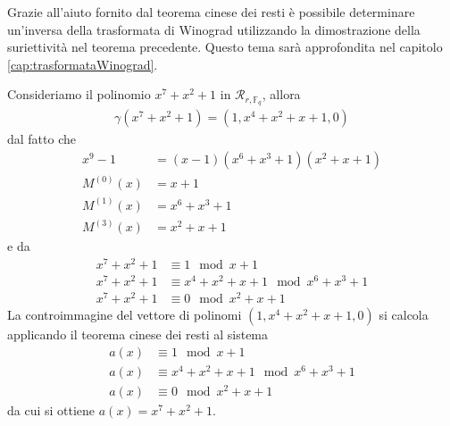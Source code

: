 \begin{osservazione}
   Grazie all'aiuto fornito dal teorema cinese dei resti è possibile determinare un'inversa della trasformata di Winograd utilizzando la dimostrazione della suriettività nel teorema precedente. Questo tema sarà approfondita nel capitolo \ref{cap:trasformataWinograd}.
\end{osservazione}
\begin{esempio}
   Consideriamo il polinomio $x^7+x^2+1$ in $\mathcal{R}_{r, \mathbb{F}_q }$, allora
   \begin{align*}
      \gamma(x^7+x^2+1) = (1, x^4 + x^2 + x + 1, 0)
   \end{align*}
   dal fatto che 
   \begin{align*}
      x^9 - 1 &= (x-1)(x^6 + x^3 + 1)(x^2 + x + 1) \\  
       M^{(0)}(x) &= x+1  \\
       M^{(1)}(x) &= x^6 + x^3 + 1 \\
       M^{(3)}(x) &= x^2 + x + 1
   \end{align*}
   e da
   \begin{align*}
    x^7+x^2+1 &\equiv 1 \mod{x+1}  \\
    x^7+x^2+1 &\equiv x^4 + x^2 + x + 1 \mod{x^6 + x^3 + 1} \\
    x^7+x^2+1 &\equiv 0 \mod{x^2 + x + 1}     
   \end{align*}
   La controimmagine del vettore di polinomi $(1, x^4 + x^2 + x + 1, 0)$ si calcola applicando il teorema cinese dei resti al sistema
   \begin{align*}
      a(x) &\equiv 1 \mod{x+1} \\
      a(x) &\equiv x^4 + x^2 + x + 1 \mod{x^6 + x^3 + 1} \\
      a(x) &\equiv 0 \mod{x^2 + x + 1}
   \end{align*}
   da cui si ottiene $a(x) = x^7+x^2+1 $.
\end{esempio}

